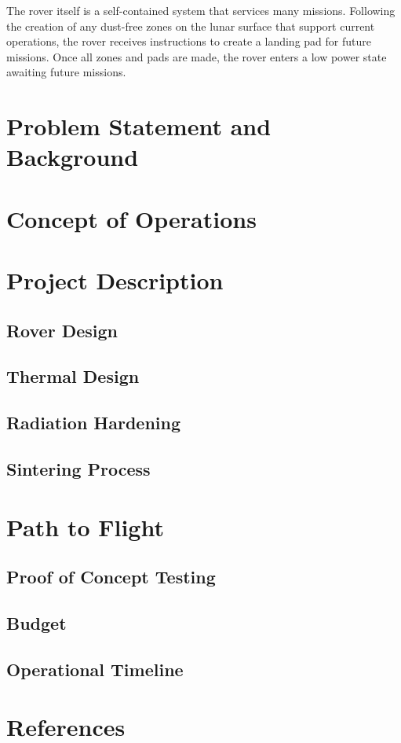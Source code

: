 \documentclass[10pt]{article}
\begin{document}
The rover itself is a self-contained system that services many missions. Following the creation of any dust-free zones on the lunar surface that support current operations, the rover receives instructions to create a landing pad for future missions. Once all zones and pads are made, the rover enters a low power state awaiting future missions.


\section{Problem Statement and Background}

\section{Concept of Operations}

\section{Project Description}

\subsection{Rover Design}

\subsection{Thermal Design}

\subsection{Radiation Hardening}

\subsection{Sintering Process}

\section{Path to Flight}

\subsection{Proof of Concept Testing}

\subsection{Budget}

\subsection{Operational Timeline}


\section{References}
\end{document}

